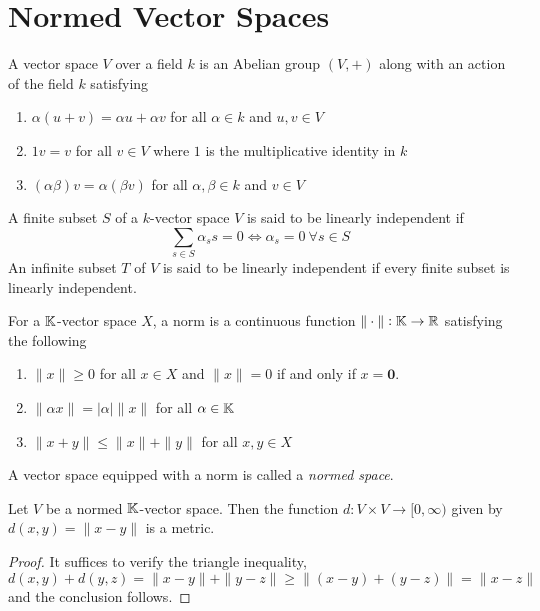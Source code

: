 \section{Normed Vector Spaces}

\begin{definition}
    A vector space $V$ over a field $k$ is an Abelian group $(V,+)$ along with an action of the field $k$ satisfying 
    \begin{enumerate}[label=(\alph*)]
        \item $\alpha(u + v) = \alpha u + \alpha v$ for all $\alpha\in k$ and $u,v\in V$ 
        \item $1v = v$ for all $v\in V$ where $1$ is the multiplicative identity in $k$
        \item $(\alpha\beta)v = \alpha(\beta v)$ for all $\alpha,\beta\in k$ and $v\in V$
    \end{enumerate}
\end{definition}

\begin{definition}
    A finite subset $S$ of a $k$-vector space $V$ is said to be linearly independent if 
    \begin{equation*}
        \sum_{s\in S}\alpha_s s = 0\Longleftrightarrow\alpha_s = 0~\forall s\in S
    \end{equation*}
    An infinite subset $T$ of $V$ is said to be linearly independent if every finite subset is linearly independent.
\end{definition}

\begin{definition}
    For a $\mathbb K$-vector space $X$, a norm is a continuous function $\|\cdot\|:\mathbb K\to\mathbb{R}$ satisfying the following 
    \begin{enumerate}[label=(\alph*)]
        \item $\|x\|\ge 0$ for all $x\in X$ and $\|x\| = 0$ if and only if $x = \mathbf 0$.
        \item $\|\alpha x\| = |\alpha|\|x\|$ for all $\alpha\in\mathbb K$ 
        \item $\|x + y\|\le \|x\| + \|y\|$ for all $x,y\in X$
    \end{enumerate}
    A vector space equipped with a norm is called a \textit{normed space}.
\end{definition}

\begin{proposition}
    Let $V$ be a normed $\mathbb K$-vector space. Then the function $d:V\times V\to[0,\infty)$ given by $d(x,y) = \|x - y\|$ is a metric.
\end{proposition}
\begin{proof}
    It suffices to verify the triangle inequality, 
    \begin{equation*}
        d(x,y) + d(y,z) = \|x - y\| + \|y - z\|\ge\|(x - y) + (y - z)\| = \|x - z\|
    \end{equation*}
    and the conclusion follows.
\end{proof}


